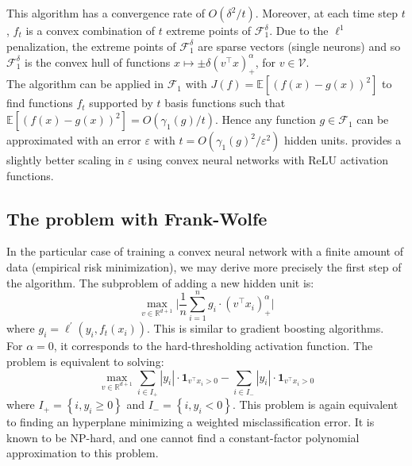 \documentclass[a4paper, 11pt]{scrartcl}
\begin{document}
{This algorithm has a convergence rate of $O(\delta^2 /t)$. Moreover, at each time step $t$, $f_t$ is a convex combination of $t$ extreme points of $\mathcal{F}_1^\delta$. Due to the $\ell^1$ penalization, the extreme points of $\mathcal{F}_1^\delta$ are sparse vectors (single neurons) and so $\mathcal{F}_1^\delta$ is the convex hull of functions $x \mapsto \pm \delta  (v^\top x)^\alpha_{+}$, for $v \in \mathcal{V}$.\\


The algorithm can be applied in $\mathcal{F}_1$ with $J(f) = \mathbb{E}\left[(f(x) - g(x))^2\right]$ to find functions $f_t$ supported by $t$ basis functions such that $\mathbb{E}\left[(f(x) - g(x))^2\right] = O(\gamma_1(g) /t)$. Hence any function $g \in \mathcal{F}_1$ can be approximated with an error $\varepsilon$ with $t = O(\gamma_1(g)^2 /\varepsilon^2)$ hidden units. \cite{bach2017breaking} provides a slightly better scaling in $\varepsilon$ using convex neural networks with ReLU activation functions.

\subsection{The problem with Frank-Wolfe}

In the particular case of training a convex neural network with a finite amount of data (empirical risk minimization), we may derive more precisely the first step of the algorithm. The subproblem of adding a new hidden unit is:
\begin{equation}
\max_{v \in \mathbb{R}^{d+1}} \Biggl\lvert\frac{1}{n} \sum_{i=1}^n g_i \cdot (v^\top x_i)^\alpha_+ \Biggr\rvert
\end{equation}
where $g_i = \ell^\prime(y_i, f_t(x_i))$. This is similar to gradient boosting algorithms.\\

For $\alpha = 0$, it corresponds to the hard-thresholding activation function. The problem is equivalent to solving:
\begin{equation}
\max_{v \in \mathbb{R}^{d+1}} \sum_{i\in I_+} |y_i| \cdot \mathbf{1}_{v^\top x_i> 0}  - \sum_{i\in I_-} |y_i| \cdot \mathbf{1}_{v^\top x_i> 0}
\end{equation}
where $I_+ = \left\{i, y_i \geq 0 \right\}$ and $I_- = \left\{i, y_i < 0 \right\}$. This problem is again equivalent to finding an hyperplane minimizing a weighted misclassification error. It is known to be NP-hard, and one cannot find a constant-factor polynomial approximation to this problem.\\

}
\end{document}
